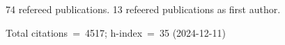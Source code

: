 74 refereed publications. 13 refeered publications as first author.

Total citations~=~4517; h-index~=~35 (2024-12-11)
